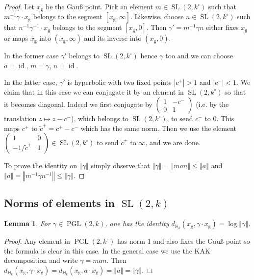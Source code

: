 \documentclass[11pt]{article}
\newtheorem{lemm}[theo]{Lemma}
\theoremstyle{definition}
\numberwithin{equation}{section}
\numberwithin{figure}{section}
\numberwithin{table}{section}
\DeclareMathOperator{\id}{id}
\DeclareMathOperator{\SL}{SL}
\DeclareMathOperator{\PGL}{PGL}
\newcommand{\hh}{\mathbb{H}}
\newcommand{\norm}[1]{\left\Vert#1\right\Vert}
\newcommand{\lrpar}[1]{\left(#1\right)}
\newcommand{\SLk}{\SL(2,k)}
\newcommand{\PGLk}{\PGL(2, k)}
\begin{document}
\begin{proof}
Let $x_{\mathrm{g}}$ be the Gau{\ss} point. Pick an element $m\in \SL(2,k^\circ)$ such that $m^{-1} \gamma\cdot x_{\mathrm{g}}$ belongs to the segment $[x_{\mathrm{g}}, \infty]$. Likewise, choose $n\in \SL(2,k^\circ)$ such that $n^{-1} \gamma^{-1} \cdot x_{\mathrm{g}}$ belongs to the segment $[x_{\mathrm{g}}, 0]$. Then $\gamma' = m^{-1} \gamma n$ either fixes $x_{\mathrm{g}}$ or maps $x_{\mathrm{g}}$ into $(x_{\mathrm{g}}, \infty)$ and its inverse into $(x_{\mathrm{g}},0)$.

In the former case $\gamma'$ belongs to $\SL(2,k^\circ)$ hence $\gamma$ too and we can choose $a = \id$, $m = \gamma$, $n=\id$.

In the latter case, $\gamma'$ is hyperbolic with two fixed points $|c^+| >1$ and $|c^-|<1$. We claim that in this case we can conjugate it by an element in $\SL(2,k^\circ)$ so that it becomes diagonal. Indeed we first conjugate by $\lrpar{
\begin{smallmatrix}
1 & -c^- \\ 0 & 1
\end{smallmatrix}}$ (i.e. by the translation $z\mapsto z-c^-$), which belongs to $\SL(2,k^\circ)$, to send $c^-$ to 0. This maps $c^+$ to $ \tilde c^+ = c^+ - c^-$ which has the same norm. Then we use the element $\lrpar{
\begin{smallmatrix}
1 & 0\\ -1/\tilde c^+ & 1
\end{smallmatrix}}\in \SL(2,k^\circ)$ to send $ \tilde c^+$ to $\infty$, and we are done.

To prove the identity on $\norm{\gamma}$ simply observe that $\norm{\gamma} = \norm{man} \le \norm{a}$ and $ \norm{a} = \norm{m^{-1} \gamma n^{-1}} \le \norm{\gamma}$.
\end{proof}

\subsection{Norms of elements in \texorpdfstring{$\SLk$}{SLk}}

\begin{lemm}
For $\gamma\in \PGLk$, one has the identity $d_{\hh_k}(x_{\mathrm{g}}, \gamma\cdot x_{\mathrm{g}}) = \log \norm{\gamma}$.
\end{lemm}

\begin{proof}
Any element in $\PGL(2,k^\circ)$ has norm $1$ and also fixes the Gau{\ss} point so the formula is clear in this case. In the general case we use the KAK decomposition and write $\gamma = man$. Then $d_{\hh_k}(x_{\mathrm{g}}, \gamma\cdot x_{\mathrm{g}}) = d_{\hh_k}(x_{\mathrm{g}}, a \cdot x_{\mathrm{g}}) = \norm{a}=\norm{\gamma}$.
\end{proof}
\end{document}
